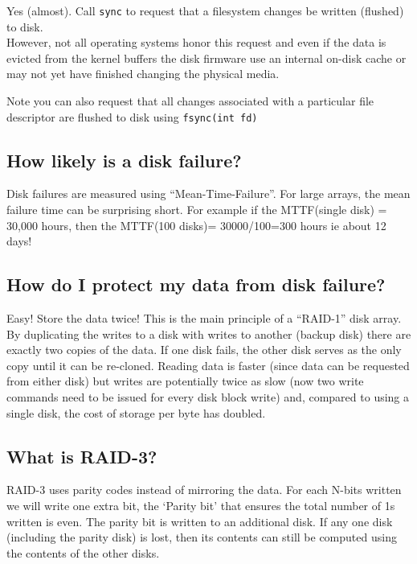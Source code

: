 Yes (almost). Call \texttt{sync} to request that a filesystem changes be
written (flushed) to disk.\\However, not all operating systems honor
this request and even if the data is evicted from the kernel buffers the
disk firmware use an internal on-disk cache or may not yet have finished
changing the physical media.

Note you can also request that all changes associated with a particular
file descriptor are flushed to disk using \texttt{fsync(int\ fd)}

\subsection{How likely is a disk
failure?}\label{how-likely-is-a-disk-failure}

Disk failures are measured using ``Mean-Time-Failure''. For large
arrays, the mean failure time can be surprising short. For example if
the MTTF(single disk) = 30,000 hours, then the MTTF(100 disks)=
30000/100=300 hours ie about 12 days!

\subsection{How do I protect my data from disk
failure?}\label{how-do-i-protect-my-data-from-disk-failure}

Easy! Store the data twice! This is the main principle of a ``RAID-1''
disk array. By duplicating the writes to a disk with writes to another
(backup disk) there are exactly two copies of the data. If one disk
fails, the other disk serves as the only copy until it can be re-cloned.
Reading data is faster (since data can be requested from either disk)
but writes are potentially twice as slow (now two write commands need to
be issued for every disk block write) and, compared to using a single
disk, the cost of storage per byte has doubled.

\subsection{What is RAID-3?}\label{what-is-raid-3}

RAID-3 uses parity codes instead of mirroring the data. For each N-bits
written we will write one extra bit, the `Parity bit' that ensures the
total number of 1s written is even. The parity bit is written to an
additional disk. If any one disk (including the parity disk) is lost,
then its contents can still be computed using the contents of the other
disks.


